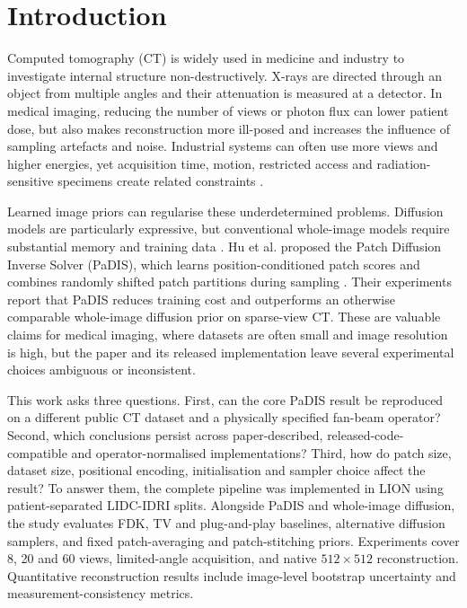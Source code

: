 
\ifpdf
    \graphicspath{{Chapter1/Figs/Raster/}{Chapter1/Figs/PDF/}{Chapter1/Figs/}}
\else
    \graphicspath{{Chapter1/Figs/Vector/}{Chapter1/Figs/}}
\fi


\chapter{Introduction}

Computed tomography (CT) is widely used in medicine and industry to investigate internal structure non-destructively. X-rays are directed through an object from multiple angles and their attenuation is measured at a detector. In medical imaging, reducing the number of views or photon flux can lower patient dose, but also makes reconstruction more ill-posed and increases the influence of sampling artefacts and noise. Industrial systems can often use more views and higher energies, yet acquisition time, motion, restricted access and radiation-sensitive specimens create related constraints \cite{}.

Learned image priors can regularise these underdetermined problems. Diffusion models are particularly expressive, but conventional whole-image models require substantial memory and training data \cite{}. Hu et al. proposed the Patch Diffusion Inverse Solver (PaDIS), which learns position-conditioned patch scores and combines randomly shifted patch partitions during sampling \cite{PaDIS}. Their experiments report that PaDIS reduces training cost and outperforms an otherwise comparable whole-image diffusion prior on sparse-view CT. These are valuable claims for medical imaging, where datasets are often small and image resolution is high, but the paper and its released implementation leave several experimental choices ambiguous or inconsistent.

This work asks three questions. First, can the core PaDIS result be reproduced on a different public CT dataset and a physically specified fan-beam operator? Second, which conclusions persist across paper-described, released-code-compatible and operator-normalised implementations? Third, how do patch size, dataset size, positional encoding, initialisation and sampler choice affect the result? To answer them, the complete pipeline was implemented in LION \cite{lion} using patient-separated LIDC-IDRI splits. Alongside PaDIS and whole-image diffusion, the study evaluates FDK, TV and plug-and-play baselines, alternative diffusion samplers, and fixed patch-averaging and patch-stitching priors. Experiments cover 8, 20 and 60 views, limited-angle acquisition, and native $512\times512$ reconstruction. Quantitative reconstruction results include image-level bootstrap uncertainty and measurement-consistency metrics.

